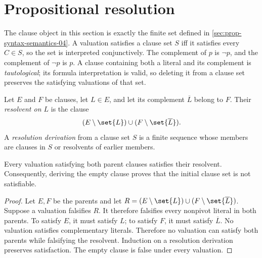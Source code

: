 \section{Propositional resolution}
\label{sec:prop-metatheory-04}

The clause object in this section is exactly the finite set defined in
\cref{sec:prop-syntax-semantics-04}.  A valuation satisfies a clause set \(S\) iff it
satisfies every \(C\in S\), so the set is interpreted conjunctively.  The
complement of \(p\) is \(\neg p\), and the complement of \(\neg p\) is
\(p\).  A clause containing both a literal and its complement is
\emph{tautological}; its formula interpretation is valid, so deleting it from
a clause set preserves the satisfying valuations of that set.

\begin{definition}[Resolvent]
Let \(E\) and \(F\) be clauses, let \(L\in E\), and let its complement
\(\overline L\) belong to \(F\).  Their \emph{resolvent on \(L\)} is the
clause
\[
  (E\setminus\set{L})\cup(F\setminus\set{\overline L}).
\]
A \emph{resolution derivation} from a clause set \(S\) is a finite sequence
whose members are clauses in \(S\) or resolvents of earlier members.
\end{definition}

\begin{theorem}
Every valuation satisfying both parent clauses satisfies their resolvent.
Consequently, deriving the empty clause proves that the initial clause set is
not satisfiable.
\end{theorem}
\begin{proof}
Let \(E,F\) be the parents and let
\(R=(E\setminus\set{L})\cup(F\setminus\set{\overline L})\).  Suppose a
valuation falsifies \(R\).  It therefore falsifies every nonpivot literal in
both parents.  To satisfy \(E\), it must satisfy \(L\); to satisfy \(F\), it
must satisfy \(\overline L\).  No valuation satisfies complementary
literals.  Therefore no valuation can satisfy both parents while falsifying
the resolvent.  Induction on a resolution derivation preserves satisfaction.
The empty clause is false under every valuation.
\end{proof}

